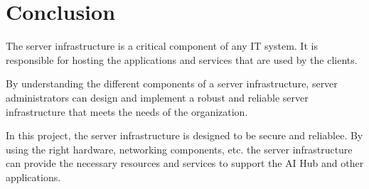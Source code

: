 \cite{containerization} 

\section{Conclusion}

The server infrastructure is a critical component of any IT system. It is responsible for hosting the applications and services that are used by the clients.

By understanding the different components of a server infrastructure, server administrators can design and implement a robust and reliable server infrastructure that meets the needs of the organization.

In this project, the server infrastructure is designed to be secure and reliablee. By using the right hardware, networking components, etc. the server infrastructure can provide the necessary resources and services to support the AI Hub and other applications.


